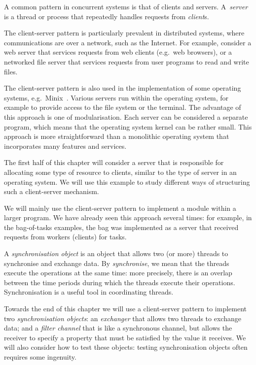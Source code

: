 A common pattern in concurrent systems is that of clients and servers.
A~\emph{server} is a thread or process that repeatedly handles requests from
\emph{client}s.

The client-server pattern is particularly prevalent in distributed systems,
where communications are over a network, such as the Internet.  For example,
consider a web server that services requests from web clients (e.g.~web
browsers), or a networked file server that services requests from user
programs to read and write files.

The client-server pattern is also used in the implementation of some operating
systems, e.g.~Minix~\cite{minix}.  Various servers run within the operating
system, for example to provide access to the file system or the terminal.  The
advantage of this approach is one of modularisation.  Each server can be
considered a separate program, which means that the operating system kernel
can be rather small.  This approach is more straightforward than a monolithic
operating system that incorporates many features and services.

The first half of this chapter will consider a server that is responsible for
allocating some type of resource to clients, similar to the type of server in
an operating system.  We will use this example to study different ways of
structuring such a client-server mechanism.

We will mainly use the client-server pattern to implement a module within a
larger program.  We have already seen this
approach several times: for example, in the bag-of-tasks examples, the bag was
implemented as a server that received requests from workers (clients) for
tasks.
 
A \emph{synchronisation object} is an object that allows two (or more) threads
to synchronise and exchange data.  By \emph{synchronise}, we mean that the
threads execute the operations at the same time: more precisely, there is an
overlap between the time periods during which the threads execute their
operations.  Synchronisation is a useful tool in coordinating threads. 

Towards the end of this chapter we will use a client-server pattern to
implement two \emph{synchronisation objects}: an \emph{exchanger} that allows
two threads to exchange data; and a \emph{filter channel} that is like a
synchronous channel, but allows the receiver to specify a property that must
be satisfied by the value it receives.  We will also consider how to test
these objects: testing synchronisation objects often requires some ingenuity.

